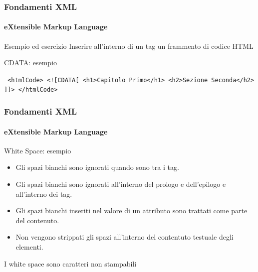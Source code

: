 \begin{frame}
    \frametitle{Fondamenti XML}
    \framesubtitle{eXtensible Markup Language}
    \addtocounter{nframe}{1}

	\begin{block}{Esempio ed esercizio}
		Inserire all'interno di un tag un frammento di codice HTML
	\end{block}

	\begin{block}{CDATA: esempio}
		\begin{center}
			\texttt{
			<htmlCode>
			 <![CDATA[
			 		<h1>Capitolo Primo</h1>
			 		<h2>Sezione Seconda</h2>
			 	]]>
			 </htmlCode>
			 }
		\end{center}
	\end{block}

\end{frame}



\begin{frame}
    \frametitle{Fondamenti XML}
    \framesubtitle{eXtensible Markup Language}
    \addtocounter{nframe}{1}

	\begin{block}{White Space: esempio}
		\begin{itemize}
			\item Gli spazi bianchi sono ignorati quando sono tra i tag.
			\item Gli spazi bianchi sono ignorati all'interno del prologo e dell'epilogo e all'interno dei tag. 
			\item Gli spazi bianchi inseriti nel valore di un attributo sono trattati come parte del contenuto.
			\item Non vengono strippati gli spazi all'interno del contentuto testuale degli elementi.
		\end{itemize}
	\end{block}

	\begin{tiny}
		I white space sono caratteri non stampabili
	\end{tiny}


\end{frame}

